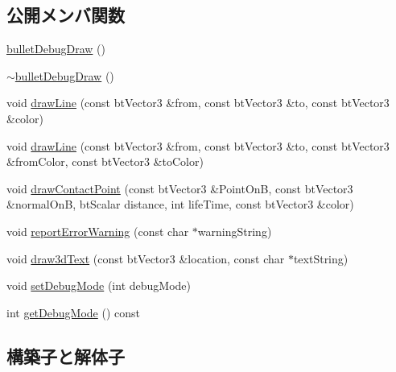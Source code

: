 \subsection*{公開メンバ関数}
\begin{DoxyCompactItemize}
\item 
\mbox{\hyperlink{class_k___physics_1_1bullet_debug_draw_ac969f58383a6b62a778bb16eb4026ad6}{bullet\+Debug\+Draw}} ()
\item 
\mbox{\hyperlink{class_k___physics_1_1bullet_debug_draw_a2b26e0588632a32ecef03088f0486378}{$\sim$bullet\+Debug\+Draw}} ()
\item 
void \mbox{\hyperlink{class_k___physics_1_1bullet_debug_draw_a361177ad23a76003b5e0811e4d3643d5}{draw\+Line}} (const bt\+Vector3 \&from, const bt\+Vector3 \&to, const bt\+Vector3 \&color)
\item 
void \mbox{\hyperlink{class_k___physics_1_1bullet_debug_draw_a0842dd424336cc1e332cd2c01f68ac86}{draw\+Line}} (const bt\+Vector3 \&from, const bt\+Vector3 \&to, const bt\+Vector3 \&from\+Color, const bt\+Vector3 \&to\+Color)
\item 
void \mbox{\hyperlink{class_k___physics_1_1bullet_debug_draw_aee36880ac9b46c4379317b8f6d77d312}{draw\+Contact\+Point}} (const bt\+Vector3 \&Point\+OnB, const bt\+Vector3 \&normal\+OnB, bt\+Scalar distance, int life\+Time, const bt\+Vector3 \&color)
\item 
void \mbox{\hyperlink{class_k___physics_1_1bullet_debug_draw_aa421c8d4afa407e1e8c9784fce42115e}{report\+Error\+Warning}} (const char $\ast$warning\+String)
\item 
void \mbox{\hyperlink{class_k___physics_1_1bullet_debug_draw_ad3e665ca605b58a03474ccafc02a5bd9}{draw3d\+Text}} (const bt\+Vector3 \&location, const char $\ast$text\+String)
\item 
void \mbox{\hyperlink{class_k___physics_1_1bullet_debug_draw_a1502ab78aca04f7cae91532fb24a4875}{set\+Debug\+Mode}} (int debug\+Mode)
\item 
int \mbox{\hyperlink{class_k___physics_1_1bullet_debug_draw_aafca54d1beeece0bcaaf3da4765e7699}{get\+Debug\+Mode}} () const
\end{DoxyCompactItemize}


\subsection{構築子と解体子}
\mbox{\label{class_k___physics_1_1bullet_debug_draw_ac969f58383a6b62a778bb16eb4026ad6}} 
